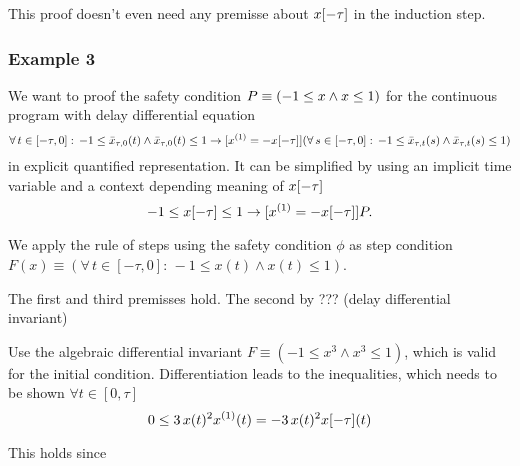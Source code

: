 \documentclass[10pt]{report}
\begin{document}
            This proof doesn't even need any premisse about $x[-\tau]$ in the induction step.

        \subsubsection{Example 3}
            \label{sec:ddi-example-3}

            We want to proof the safety condition $P\equiv(-1\leq x\wedge x\leq 1)$ for the continuous program with delay differential equation
            \begin{equation}
                \forall\,t\in[-\tau,0]:\,-1\leq\xbartaut{0}(t)\wedge\xbartaut{0}(t)\leq 1
                \rightarrow
                [\D{x}=-\x[-\tau]] (\forall\,s\in[-\tau,0]:\,-1\leq\xbartaut{t}(s)\wedge\xbartaut{t}(s)\leq 1)
            \end{equation}
            in explicit quantified representation. It can be simplified by using an implicit time variable and a context depending meaning of $x[-\tau]$
            \begin{equation}
                -1\leq\x[-\tau]\leq 1 \rightarrow [\D{x}=-\x[-\tau]]\asfml.
            \end{equation}

            We apply the rule of steps using the safety condition $\phi$ as step condition $F(x)\equiv(\forall\,t\in[-\tau,0]:\,-1\leq x(t)\wedge x(t)\leq 1)$.

            The first and third premisses hold. The second by ??? (delay differential invariant)

            Use the algebraic differential invariant $F\equiv(-1\leq x^3\wedge x^3\leq1)$, which is valid for the initial condition. Differentiation leads to the inequalities, which needs to be shown $\forall t\in[0,\tau]$
            \begin{equation}
                0\leq 3\,x(t)^2 \D{x}(t) = -3\,x(t)^2 \x[-\tau](t)
            \end{equation}

            This holds since






\nocite{Fulton16LogicProofs,*}


\end{document}
